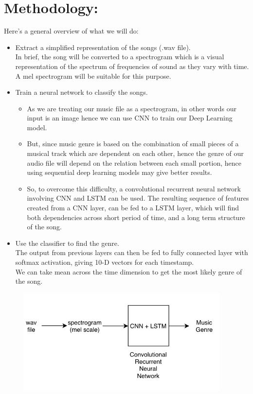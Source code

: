 \documentclass[]{report}
\begin{document}
\section{Methodology:}
\large 
Here’s a general overview of what we will do:
\begin{itemize}
	\item Extract a simplified representation of the songs (.wav file).
	\\
	In brief, the song will be converted to a spectrogram which is a visual representation of the spectrum of frequencies of sound as they vary with time. A mel spectrogram will be suitable for this purpose. 

	\item Train a neural network to classify the songs. 
	\begin{itemize}
	\item As we are treating our music file as a spectrogram, in other words our input is an image hence we can use CNN to train our Deep Learning model. 
	\item But, since music genre is based on the combination of small pieces of a musical track which are dependent on each other, hence the genre of our audio file will depend on the relation between each small portion, hence using sequential deep learning models may give better results.
	\item So, to overcome this difficulty, a convolutional recurrent neural network involving CNN and LSTM can be used. The resulting sequence of features created from a CNN layer, can be fed to a LSTM layer, which will find both dependencies across short period of time, and a long term structure of the song. 
	\end{itemize}
	\item Use the classifier to find the genre.
	\\
	The output from previous layers can then be fed to fully connected layer with softmax activation, giving 10-D vectors for each timestamp.
	\\ 
	We can take mean across the time dimension to get the most likely genre of the song.
	
	
\end{itemize}

\begin{figure}[H]
	\vspace{0pt}
	\includegraphics[height = 150pt, keepaspectratio]{methodology.png}
\end{figure}
\end{document}
